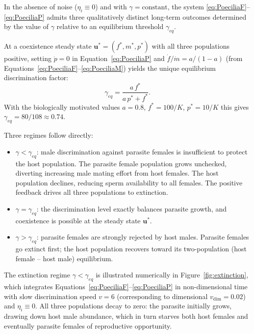\documentclass[12pt]{article}
\begin{document}
In the absence of noise ($\eta_i \equiv 0$) and with $\gamma = \text{constant}$,
the system \eqref{eq:PoeciliaF}--\eqref{eq:PoeciliaP} admits three
qualitatively distinct long-term outcomes determined by the value of $\gamma$
relative to an equilibrium threshold $\gamma_{eq}$.

At a coexistence steady state $\mathbf{u}^* = (f^*, m^*, p^*)$ with all
three populations positive, setting $\dot{p} = 0$ in
Equation~\eqref{eq:PoeciliaP} and $\dot{f}/\dot{m} = a/(1-a)$ (from
Equations~\eqref{eq:PoeciliaF}--\eqref{eq:PoeciliaM}) yields the unique
equilibrium discrimination factor:
\begin{equation}\label{eq:GammaSS}
  \gamma_{eq} = \frac{a\,f^*}{a\,p^* + f^*}.
\end{equation}
With the biologically motivated values $a = 0.8$, $f^* = 100/K$,
$p^* = 10/K$ this gives $\gamma_{eq} = 80/108 \approx 0.74$.

Three regimes follow directly:

\begin{itemize}
  \item $\gamma < \gamma_{eq}$: male discrimination against parasite
    females is insufficient to protect the host population. The parasite
    female population grows unchecked, diverting increasing male mating
    effort from host females. The host population declines, reducing
    sperm availability to all females. The positive feedback drives all
    three populations to extinction.

  \item $\gamma = \gamma_{eq}$: the discrimination level exactly balances
    parasite growth, and coexistence is possible at the steady state
    $\mathbf{u}^*$.

  \item $\gamma > \gamma_{eq}$: parasite females are strongly rejected by
    host males. Parasite females go extinct first; the host population
    recovers toward its two-population (host female -- host male) equilibrium.
\end{itemize}

The extinction regime $\gamma < \gamma_{eq}$ is illustrated numerically
in Figure~\ref{fig:extinction}, which integrates
Equations~\eqref{eq:PoeciliaF}--\eqref{eq:PoeciliaP} in non-dimensional
time with slow discrimination speed $v = 6$ (corresponding to dimensional
$v_{\mathrm{dim}} = 0.02$) and $\eta_i \equiv 0$.  All three populations
decay to zero: the parasite initially grows, drawing down host male
abundance, which in turn starves both host females and eventually
parasite females of reproductive opportunity.
\end{document}
